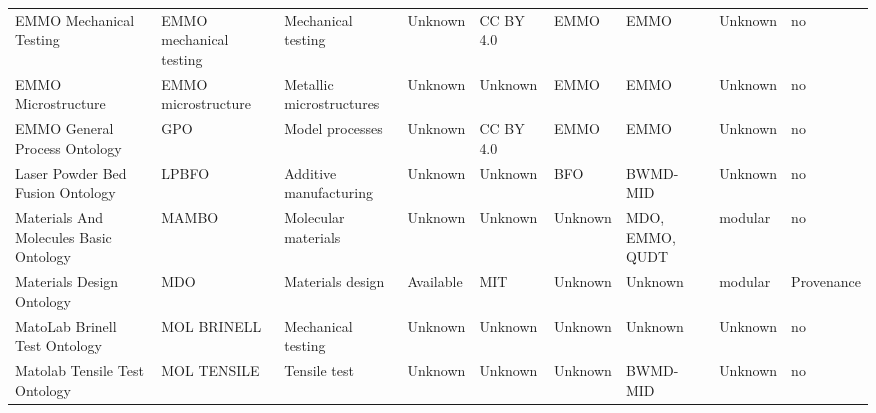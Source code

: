 \begin{table}
\begin{tabular}{m{5cm}m{2cm}m{5cm}m{2cm}m{2cm}m{2cm}m{2cm}m{2cm}m{2cm}}
                                                          EMMO Mechanical Testing & EMMO mechanical testing &                                                                Mechanical testing &              Unknown &    CC BY 4.0 &                         EMMO &              EMMO &    Unknown &               no \\
                                                              EMMO Microstructure &     EMMO microstructure &                                                          Metallic microstructures &              Unknown &      Unknown &                         EMMO &              EMMO &    Unknown &               no \\
                                                    EMMO General Process Ontology &                     GPO &                                                                   Model processes &              Unknown &    CC BY 4.0 &                         EMMO &              EMMO &    Unknown &               no \\
                            Laser Powder Bed Fusion Ontology &                   LPBFO &                                                            Additive manufacturing &              Unknown &      Unknown &                          BFO &          BWMD-MID &    Unknown &               no \\
                     Materials And Molecules Basic Ontology &                   MAMBO &                                                               Molecular materials &              Unknown &      Unknown &                      Unknown &   MDO, EMMO, QUDT &    modular &               no \\
                                             Materials Design Ontology &                     MDO &                                                                  Materials design &            Available &         MIT  &                      Unknown &           Unknown &    modular &       Provenance \\
                                                    MatoLab Brinell Test Ontology &             MOL BRINELL &                                                                Mechanical testing &              Unknown &      Unknown &                      Unknown &           Unknown &    Unknown &               no \\
                                                    Matolab Tensile Test Ontology &             MOL TENSILE &                                                                      Tensile test &              Unknown &      Unknown &                      Unknown &          BWMD-MID &    Unknown &               no \\

\end{tabular}
\end{table}
